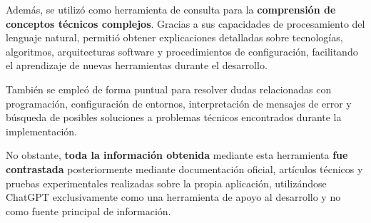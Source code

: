 Además, se utilizó como herramienta de consulta para la \textbf{comprensión de conceptos técnicos complejos}. Gracias a sus capacidades de procesamiento del lenguaje natural, permitió obtener explicaciones detalladas sobre tecnologías, algoritmos, arquitecturas software y procedimientos de configuración, facilitando el aprendizaje de nuevas herramientas durante el desarrollo.

También se empleó de forma puntual para resolver dudas relacionadas con programación, configuración de entornos, interpretación de mensajes de error y búsqueda de posibles soluciones a problemas técnicos encontrados durante la implementación.

No obstante, \textbf{toda la información obtenida} mediante esta herramienta \textbf{fue contrastada} posteriormente mediante documentación oficial, artículos técnicos y pruebas experimentales realizadas sobre la propia aplicación, utilizándose ChatGPT exclusivamente como una herramienta de apoyo al desarrollo y no como fuente principal de información.